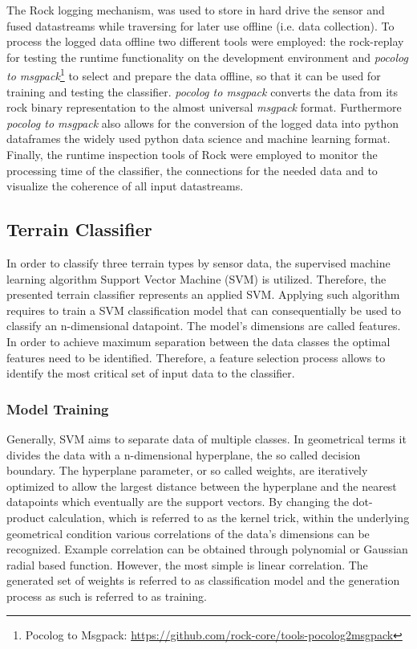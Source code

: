 \documentclass{article}
\begin{document}
The Rock logging mechanism, was used to store in hard drive the sensor and fused datastreams while traversing for later use offline (i.e. data collection). 
To process the logged data offline two different tools were employed: the rock-replay for testing the runtime functionality on the development environment and \emph{pocolog to msgpack}\footnote{Pocolog to Msgpack: \url{https://github.com/rock-core/tools-pocolog2msgpack}} to select and prepare the data offline, so that it can be used for training and testing the classifier.
\emph{pocolog to msgpack} converts the data from its rock binary representation to the almost universal \emph{msgpack} format.
Furthermore \emph{pocolog to msgpack} also allows for the conversion of the logged data into python dataframes the widely used python data science and machine learning format. 
Finally, the runtime inspection tools of Rock were employed to monitor the processing time of the classifier, the connections for the needed data and to visualize the coherence of all input datastreams. 


\subsection{Terrain Classifier}

In order to classify three terrain types by sensor data, the supervised machine learning algorithm Support Vector Machine (SVM) is utilized. Therefore, the presented terrain classifier represents an applied SVM. Applying such algorithm requires to train a SVM classification model that can consequentially be used to classify an n-dimensional datapoint.
The model's dimensions are called features. In order to achieve maximum separation between the data classes the optimal features need to be identified. Therefore, a feature selection process allows to identify the most critical set of input data to the classifier. 

\subsubsection{Model Training}
Generally, SVM aims to separate data of multiple classes. In geometrical terms it divides the data with a n-dimensional hyperplane, the so called decision boundary. The hyperplane parameter, or so called weights, are iteratively optimized to allow the largest distance between the hyperplane and the nearest datapoints which eventually are the support vectors.  
By changing the dot-product calculation, which is referred to as the kernel trick, within the underlying geometrical condition various correlations of the data's dimensions can be recognized. Example correlation can be obtained through polynomial or Gaussian radial based function. However, the most simple is linear correlation.
The generated set of weights is referred to as classification model and the generation process as such is referred to as training.\cite{kuhr2021}
\end{document}
